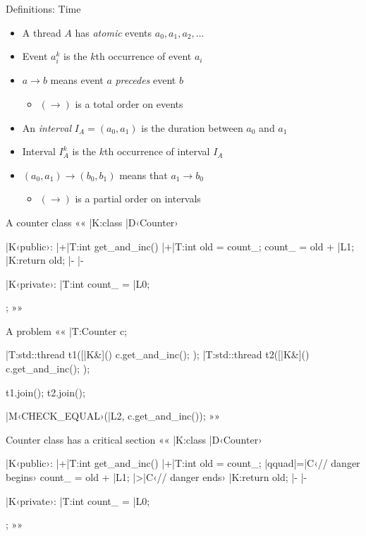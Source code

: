 \documentclass{beamer}
\begin{document}
\begin{frame}
\thispagestyle{empty}\centering
{}
\end{frame}

\begin{frame}{Definitions: Time}
  \begin{itemize}
    \item<1-> A thread $A$ has \emph{atomic} events $a_0, a_1, a_2, \ldots$
    \item<2-> Event $a_i^k$ is the $k$th occurrence of event $a_i$
    \item<3-> $a \to b$ means event $a$ \emph{precedes} event $b$
      \begin{itemize}
        \item $(\to)$ is a total order on events
      \end{itemize}
    \item<4-> An \emph{interval} $I_A = (a_0, a_1)$ is the duration between
      $a_0$ and $a_1$
    \item<5-> Interval $I_A^k$ is the $k$th occurrence of interval $I_A$
    \item<6-> $(a_0, a_1) \to (b_0, b_1)$ means that $a_1 \to b_0$
      \begin{itemize}
        \item $(\to)$ is a partial order on intervals
      \end{itemize}
  \end{itemize}
\end{frame}

\begin{frame}[fragile]{A counter class}{}
  ««
  |K:class |D‹Counter›
  {
  |K‹public›:
  	|+|T:int get_and_inc()
    {
    	|+|T:int old = count_;
      count_ = old + |L1;
      |K:return old; |-
    } |-

  |K‹private›:
  	|T:int count_ = |L0;
  };
  »»
\end{frame}

\begin{frame}[fragile]{A problem}{}
««
|T:Counter c;

|T:std::thread t1([|K&]() { c.get_and_inc(); });
|T:std::thread t2([|K&]() { c.get_and_inc(); });

t1.join();
t2.join();

|M‹CHECK_EQUAL›(|L2, c.get_and_inc());
»»
\end{frame}

\begin{frame}[fragile]{Counter class has a critical section}{}
  ««
  |K:class |D‹Counter›
  {
  |K‹public›:
  	|+|T:int get_and_inc()
    {
    	|+|T:int old = count_; |qquad|=|C‹// danger begins›
      count_ = old + |L1;          |>|C‹// danger ends›
      |K:return old; |-
    } |-

  |K‹private›:
  	|T:int count_ = |L0;
  };
  »»
\end{frame}
\end{document}
